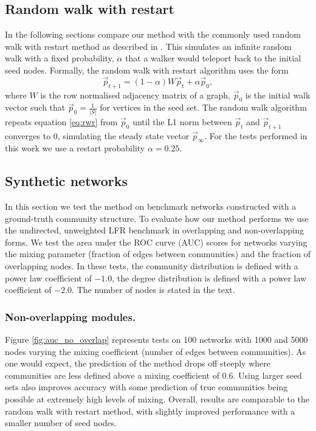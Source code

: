 \documentclass[sigconf]{acmart}
\begin{document}
\subsection{Random walk with restart}
In the following sections compare our method with the commonly used random walk with restart method as described in \cite{kohler2008walking}.
This simulates an infinite random walk with a fixed probability, $\alpha$ that a walker would teleport back to the initial seed nodes. 
Formally, the random walk with restart algorithm uses the form
\begin{equation} \label{eq:rwr}
 \vec{p}_{t+1} = (1 - \alpha) W \vec{p}_t + \alpha \vec{p}_0,
\end{equation}
where $W$ is the row normalised adjacency matrix of a graph, $\vec{p}_0$ is the initial walk vector such that $\vec{p}_0 = \frac{1}{|S|}$ for vertices in the seed set.
The random walk algorithm repeats equation \ref{eq:rwr} from $\vec{p}_0$ until the L1 norm between  $\vec{p}_t$ and  $\vec{p}_{t+1}$ converges to 0, simulating the steady state vector $\vec{p}_{\infty}$.
For the tests performed in this work we use a restart probability $\alpha = 0.25$.

\subsection{Synthetic networks}
In this section we test the method on benchmark networks constructed with a ground-truth community structure.
To evaluate how our method performs we use the undirected, unweighted LFR benchmark \cite{lancichinetti2008benchmark} in overlapping and non-overlapping forms.
We test the area under the ROC curve (AUC) scores for networks varying the mixing parameter (fraction of edges between communities) and the fraction of overlapping nodes.
In these tests, the community distribution is defined with a power law coefficient of $-1.0$, the degree distribution is defined with a power law coefficient of $-2.0$.
The number of nodes is stated in the text.

\subsubsection{Non-overlapping modules.}
Figure \ref{fig:auc_no_overlap} represents tests on 100 networks with 1000 and 5000 nodes varying the mixing coefficient (number of edges between communities).
As one would expect, the prediction of the method drops off steeply where communities are less defined above a mixing coefficient of 0.6.
Using larger seed sets also improves accuracy with some prediction of true communities being possible at extremely high levels of mixing.
Overall, results are comparable to the random walk with restart method, with slightly improved performance with a smaller number of seed nodes.
\end{document}
